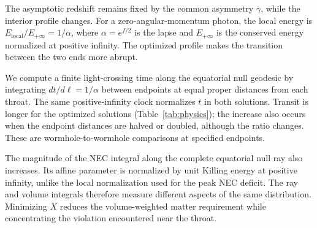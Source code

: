 The asymptotic redshift remains fixed by the common asymmetry $\gamma$,
while the interior profile changes. For a zero-angular-momentum photon,
the local energy is $E_{\mathrm{local}}/E_{+\infty}=1/\alpha$, where
$\alpha=e^{f/2}$ is the lapse and $E_{+\infty}$ is the conserved energy
normalized at positive infinity. The optimized profile makes the transition
between the two ends more abrupt.

We compute a finite light-crossing time along the equatorial null geodesic
by integrating $dt/d\ell=1/\alpha$ between endpoints at equal proper
distances from each throat. The same positive-infinity clock normalizes
$t$ in both solutions. Transit is longer for the optimized solutions
(Table~\ref{tab:physics}); the increase also occurs when the endpoint
distances are halved or doubled, although the ratio changes. These are
wormhole-to-wormhole comparisons at specified endpoints.

The magnitude of the NEC integral along the complete equatorial null ray
also increases. Its affine parameter is normalized by unit Killing energy
at positive infinity, unlike the local normalization used for the peak NEC
deficit. The ray and volume integrals therefore measure different aspects
of the same distribution. Minimizing $X$ reduces the volume-weighted matter
requirement while concentrating the violation encountered near the throat.
